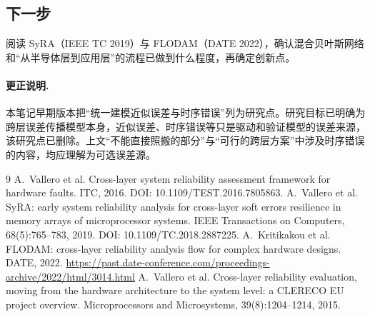 \documentclass[11pt,a4paper]{ctexart}
\begin{document}
\subsection{下一步}
阅读 SyRA（IEEE TC 2019）与 FLODAM（DATE 2022），确认混合贝叶斯网络和“从半导体层到应用层”的流程已做到什么程度，再确定创新点。

\paragraph{更正说明.} 本笔记早期版本把“统一建模近似误差与时序错误”列为研究点。研究目标已明确为跨层误差传播模型本身，近似误差、时序错误等只是驱动和验证模型的误差来源，该研究点已删除。上文“不能直接照搬的部分”与“可行的跨层方案”中涉及时序错误的内容，均应理解为可选误差源。

\begin{thebibliography}{9}
 A.~Vallero et al. Cross-layer system reliability assessment framework for hardware faults. ITC, 2016. DOI: 10.1109/TEST.2016.7805863.
 A.~Vallero et al. SyRA: early system reliability analysis for cross-layer soft errors resilience in memory arrays of microprocessor systems. IEEE Transactions on Computers, 68(5):765--783, 2019. DOI: 10.1109/TC.2018.2887225.
 A.~Kritikakou et al. FLODAM: cross-layer reliability analysis flow for complex hardware designs. DATE, 2022. \url{https://past.date-conference.com/proceedings-archive/2022/html/3014.html}
 A.~Vallero et al. Cross-layer reliability evaluation, moving from the hardware architecture to the system level: a CLERECO EU project overview. Microprocessors and Microsystems, 39(8):1204--1214, 2015.
\end{thebibliography}
\end{document}
